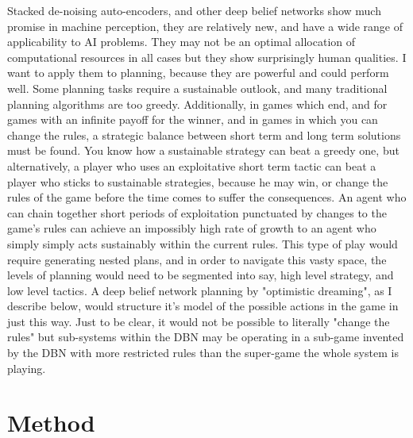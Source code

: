 \documentclass[11pt]{article}
\begin{document}
Stacked de-noising auto-encoders, and other deep belief networks show much promise in machine perception, they are relatively new, and have a wide range of applicability to AI problems. They may not be an optimal allocation of computational resources in all cases but they show surprisingly human qualities. I want to apply them to planning, because they are powerful and could perform well. Some planning tasks require a sustainable outlook, and many traditional planning algorithms are too greedy. Additionally, in games which end, and for games with an infinite payoff for the winner, and in games in which you can change the rules, a strategic balance between short term and long term solutions must be found. You know how a sustainable strategy can beat a greedy one, but alternatively, a player who uses an exploitative short term tactic can beat a player who sticks to sustainable strategies, because he may win, or change the rules of the game before the time comes to suffer the consequences. An agent who can chain together short periods of exploitation punctuated by changes to the game's rules can achieve an impossibly high rate of growth to an agent who simply simply acts sustainably within the current rules. This type of play would require generating nested plans, and in order to navigate this vasty space, the levels of planning would need to be segmented into say, high level strategy, and low level tactics. A deep belief network planning by "optimistic dreaming", as I describe below, would structure it's model of the possible actions in the game in just this way. Just to be clear, it would not be possible to literally "change the rules" but sub-systems within the DBN may be operating in a sub-game invented by the DBN with more restricted rules than the super-game the whole system is playing.

\section{Method}
\label{Method}
\end{document}
